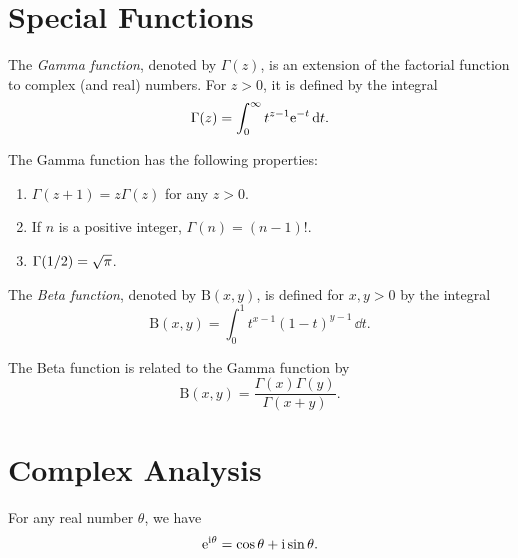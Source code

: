 \section{Special Functions}

\begin{definition}
  The \emph{Gamma function}, denoted by $\Gamma(z)$, is an extension of the factorial function to complex (and real) numbers. For $z > 0$, it is defined by the integral
  \[
    \Gamma(z) = \int_0^\infty t^{z-1} \mathrm{e}^{-t}\,\mathrm{d} t.
  \]
\end{definition}

\begin{proposition}
  The Gamma function has the following properties:
  \begin{enumerate}
    \item $\Gamma(z+1) = z \Gamma(z)$ for any $z > 0$.
    \item If $n$ is a positive integer, $\Gamma(n) = (n-1)!$.
    \item $\Gamma(1/2) = \sqrt{\mathrm{\pi}}$.
  \end{enumerate}
\end{proposition}

\begin{definition}
  The \emph{Beta function}, denoted by $\mathrm{B}(x, y)$, is defined for $x, y > 0$ by the integral
  \[
    \mathrm{B}(x, y) = \int_0^1 t^{x-1} (1-t)^{y-1}\,\dd t.
  \]
\end{definition}

\begin{proposition}
  The Beta function is related to the Gamma function by
  \[
    \mathrm{B}(x, y) = \frac{\Gamma(x)\Gamma(y)}{\Gamma(x+y)}.
  \]
\end{proposition}

\section{Complex Analysis}

\begin{theorem}
  For any real number $\theta$, we have
  \[
    \mathrm{e}^{\mathrm{i} \theta} = \cos \theta + \mathrm{i} \sin \theta.
  \]
\end{theorem}
